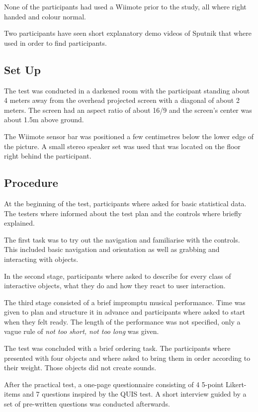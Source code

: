 \documentclass[10pt,a4paper]{scrartcl}
\begin{document}
None of the participants had used a Wiimote prior to the study, all where right handed and colour normal.

Two participants have seen short explanatory demo videos of Sputnik that where used in order to find participants.

\subsection{Set Up}
The test was conducted in a darkened room with the participant standing about 4 meters away from the overhead projected screen with a diagonal of about 2 meters. The screen had an aspect ratio of about 16/9 and the screen's center was about 1.5m above ground.

The Wiimote sensor bar was positioned a few centimetres below the lower edge of the picture. A small stereo speaker set was used that was located on the floor right behind the participant.

\subsection{Procedure}
At the beginning of the test, participants where asked for basic statistical data. The testers where informed about the test plan and the controls where briefly explained. 

The first task was to try out the navigation and familiarise with the controls. This included basic navigation and orientation as well as grabbing and interacting with objects. 

In the second stage, participants where asked to describe for every class of interactive objects, what they do and how they react to user interaction.

The third stage consisted of a brief impromptu musical performance. Time was given to plan and structure it in advance and participants where asked to start when they felt ready. The length of the performance was not specified, only a vague rule of \emph{not too short, not too long} was given.

The test was concluded with a brief ordering task. The participants where presented with four objects and where asked to bring them in order according to their weight. Those objects did not create sounds.

After the practical test, a one-page questionnaire consisting of 4 5-point Likert-items and 7 questions inspired by the QUIS\cite{Chin1988} test. A short interview guided by a set of pre-written questions was conducted afterwards.
\end{document}
